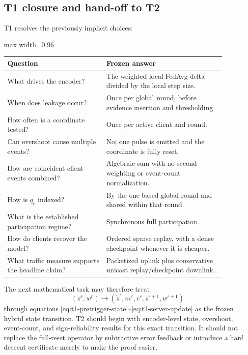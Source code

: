 \subsection{T1 closure and hand-off to T2}

T1 resolves the previously implicit choices:
\begin{center}
\begin{adjustbox}{max width=0.96\linewidth}
\begin{tabular}{p{0.40\linewidth}p{0.48\linewidth}}
\toprule
Question & Frozen answer\\
\midrule
What drives the encoder? & The weighted local FedAvg delta divided by the local step size.\\
When does leakage occur? & Once per global round, before evidence insertion and thresholding.\\
How often is a coordinate tested? & Once per active client and round.\\
Can overshoot cause multiple events? & No; one pulse is emitted and the coordinate is fully reset.\\
How are coincident client events combined? & Algebraic sum with no second weighting or event-count normalization.\\
How is $q_r$ indexed? & By the one-based global round and shared within that round.\\
What is the established participation regime? & Synchronous full participation.\\
How do clients recover the model? & Ordered sparse replay, with a dense checkpoint whenever it is cheaper.\\
What traffic measure supports the headline claim? & Packetized uplink plus conservative unicast replay/checkpoint downlink.\\
\bottomrule
\end{tabular}
\end{adjustbox}
\end{center}

The next mathematical task may therefore treat
\begin{equation}
    \boxed{
    (z^r,w^r)
    \mapsto
    (\widetilde z^r,m^r,c^r,z^{r+1},w^{r+1})
    }
\end{equation}
through equations \eqref{eq:t1-pretrigger-state}--\eqref{eq:t1-server-update} as the frozen hybrid state transition. T2 should begin with encoder-level state, overshoot, event-count, and sign-reliability results for this exact transition. It should not replace the full-reset operator by subtractive error feedback or introduce a hard descent certificate merely to make the proof easier.
